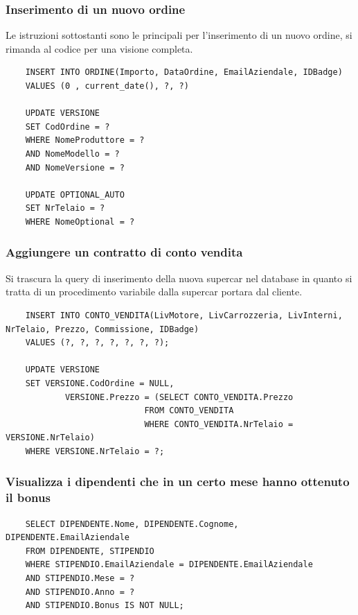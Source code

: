 \documentclass[11pt]{article}
\begin{document}
\subsubsection*{Inserimento di un nuovo ordine}

Le istruzioni sottostanti sono le principali per l'inserimento di un nuovo
ordine, si rimanda al codice per una visione completa.

\begin{lstlisting}
    INSERT INTO ORDINE(Importo, DataOrdine, EmailAziendale, IDBadge)
    VALUES (0 , current_date(), ?, ?)

    UPDATE VERSIONE
    SET CodOrdine = ?
    WHERE NomeProduttore = ?
    AND NomeModello = ?
    AND NomeVersione = ?

    UPDATE OPTIONAL_AUTO
    SET NrTelaio = ?
    WHERE NomeOptional = ?
\end{lstlisting}

\subsubsection*{Aggiungere un contratto di conto vendita}
Si trascura la query di inserimento della nuova supercar nel database in quanto
si tratta di un procedimento variabile dalla supercar portara dal cliente.

\begin{lstlisting}
    INSERT INTO CONTO_VENDITA(LivMotore, LivCarrozzeria, LivInterni, NrTelaio, Prezzo, Commissione, IDBadge)
    VALUES (?, ?, ?, ?, ?, ?, ?);

    UPDATE VERSIONE
    SET VERSIONE.CodOrdine = NULL, 
            VERSIONE.Prezzo = (SELECT CONTO_VENDITA.Prezzo 
                            FROM CONTO_VENDITA 
                            WHERE CONTO_VENDITA.NrTelaio = VERSIONE.NrTelaio) 
    WHERE VERSIONE.NrTelaio = ?;
\end{lstlisting}

\subsubsection*{Visualizza i dipendenti che in un certo mese hanno ottenuto il
bonus}

\begin{lstlisting}
    SELECT DIPENDENTE.Nome, DIPENDENTE.Cognome, DIPENDENTE.EmailAziendale
    FROM DIPENDENTE, STIPENDIO
    WHERE STIPENDIO.EmailAziendale = DIPENDENTE.EmailAziendale
    AND STIPENDIO.Mese = ?
    AND STIPENDIO.Anno = ?
    AND STIPENDIO.Bonus IS NOT NULL;
\end{lstlisting}
\end{document}
